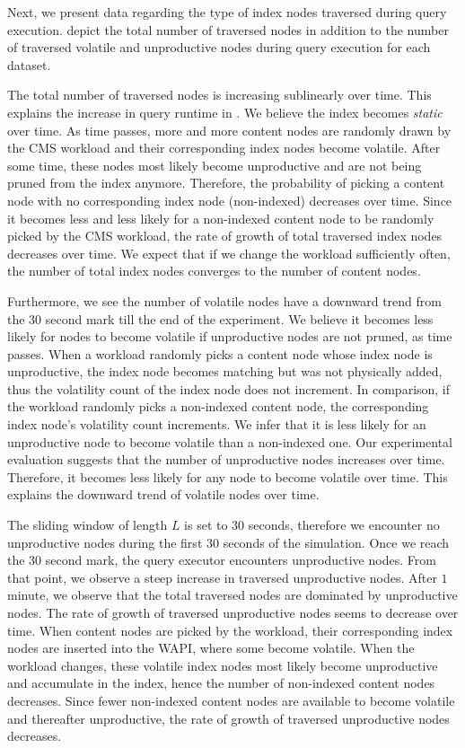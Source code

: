 \documentclass[abstracton,12pt]{scrartcl}
\theoremstyle{definition}
\begin{document}
Next, we present data regarding the type of index nodes traversed during query
execution.
 depict
the total number of traversed nodes in addition to the number of traversed
volatile and unproductive nodes during query execution for each dataset.

The total number of traversed nodes is increasing sublinearly over time. This
explains the increase in query runtime in
.
We believe the index becomes \textit{static} over time.
As time passes, more and more content nodes are randomly
drawn by the CMS workload and their corresponding index nodes become
volatile. After some time, these nodes most likely become unproductive and are
not being pruned from the index anymore.
Therefore, the probability of picking a content node with no corresponding index
node (non-indexed)
decreases over time. Since it becomes less and less likely for a non-indexed content node
to be randomly picked by the CMS workload, the rate of growth of total traversed
index nodes decreases over time. We expect that if we change the workload
sufficiently often, the number of total index nodes converges to the number of
content nodes.

Furthermore, we see the number of volatile nodes have a downward trend from the
30 second mark till the end of the experiment. We believe it becomes less likely
for nodes to become volatile if unproductive nodes are not pruned,
as time passes. When a workload randomly picks a content node whose index node is
unproductive, the index
node becomes matching but was not physically added, thus the volatility count of
the index node
does not increment. In comparison, if the workload randomly picks a non-indexed
content node, the corresponding index node's volatility count increments.
We infer that it is less
likely for an unproductive node to become volatile than a non-indexed one.
Our experimental evaluation suggests that the number of
unproductive nodes increases over time. Therefore, it becomes less likely for any
node to become volatile over time. This explains the downward trend of
volatile nodes over time.

The sliding window of length $L$ is set to $30$ seconds, therefore we encounter no
unproductive nodes during the first $30$ seconds of the simulation. Once we
reach the $30$ second mark, the query executor encounters unproductive nodes.
From that point, we observe a steep increase in traversed unproductive nodes.
After $1$ minute, we observe that the total traversed nodes are dominated by
unproductive nodes. The rate of growth of traversed unproductive nodes seems to
decrease over time. When content nodes are picked by the
workload, their corresponding index nodes are inserted into the WAPI, where some
become volatile. When the workload changes, these volatile index nodes most
likely become unproductive and accumulate in the index, hence the number of non-indexed
content nodes decreases. Since fewer non-indexed content nodes are
available to become volatile and thereafter unproductive, the rate of growth of
traversed unproductive nodes decreases.
\end{document}

